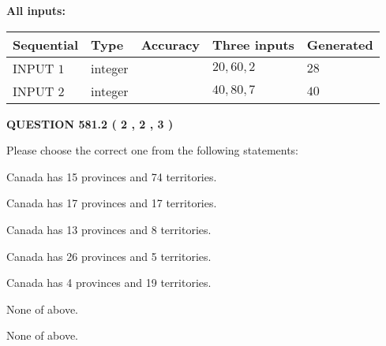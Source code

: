 \documentclass[12pt]{article}
\begin{document}
   
   
   
\noindent{}
   
   
   
   
\noindent\vspace{0.1in}\hspace{-0.08in} {\textbf{\Large{All inputs: }}}
   
   
  
  
\noindent\begin{tabular}{|l|l|l|l|l|}
\hline
 Sequential & Type & Accuracy & Three inputs & Generated \\ 
\hline
 
 
  INPUT $  1 $ & integer &  & $
 20
 , 
 60
 , 
 2
 $ & $ 28 $ 
 \\  \hline  
 
 
  INPUT $  2 $ & integer &  & $
 40
 , 
 80
 , 
 7
 $ & $ 40 $ 
 \\  \hline  
 \end{tabular}
   
   
  
\vspace{0.2in}
  
{\textbf{\Large{QUESTION
581.2 
 ( 2 , 2 , 3 )
}}}
  
  
Please choose the correct one from the following statements:
 
 
Canada has  15 provinces and  74 territories.
 
 
Canada has  17 provinces and  17 territories.
 
 
Canada has  13 provinces and  8 territories.
 
 
Canada has  26 provinces and  5 territories.
 
 
Canada has   4 provinces and  19 territories.
 
 
 None of above.
 
 
\noindent{}
 
 
 None of above.
 
 
\noindent{}
 
 
   
   
   
\end{document}
